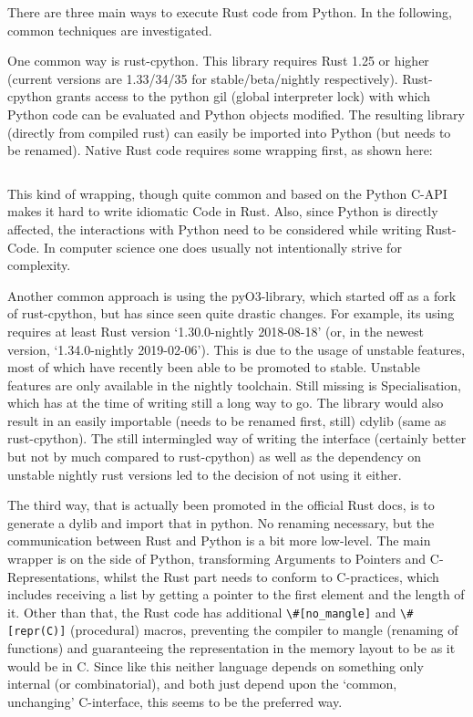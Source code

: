 There are three main ways to execute Rust code from Python. In the following,
common techniques are investigated.


One common way is rust-cpython. This library requires Rust 1.25 or higher
(current versions are 1.33/34/35 for stable/beta/nightly respectively).
Rust-cpython grants access to the python gil (global interpreter lock) with
which Python code can be evaluated and Python objects modified. The resulting
library (directly from compiled rust) can easily be imported into Python (but
needs to be renamed). Native Rust code requires some wrapping first, as shown
here:

\inputminted{Rust}{code_cpython.rs}

This kind of wrapping, though quite common and based on the Python C-API makes
it hard to write idiomatic Code in Rust. Also, since Python is directly
affected, the interactions with Python need to be considered while writing
Rust-Code. In computer science one does usually not intentionally strive for
complexity.

Another common approach is using the pyO3-library, which started off as a fork
of rust-cpython, but has since seen quite drastic changes. For example, its
using requires at least Rust version ‘1.30.0-nightly 2018-08-18’ (or, in the
newest version, ‘1.34.0-nightly 2019-02-06’). This is due to the usage of
unstable features, most of which have recently been able to be promoted to
stable. Unstable features are only available in the nightly toolchain.  Still
missing is Specialisation, which has at the time of writing still a long way to
go.  The library would also result in an easily importable (needs to be renamed
first, still) cdylib (same as rust-cpython). The still intermingled way of
writing the interface (certainly better but not by much compared to
rust-cpython) as well as the dependency on unstable nightly rust versions led
to the decision of not using it either.

The third way, that is actually been promoted in the official Rust docs, is to
generate a dylib and import that in python. No renaming necessary, but the
communication between Rust and Python is a bit more low-level. The main wrapper
is on the side of Python, transforming Arguments to Pointers and
C-Representations, whilst the Rust part needs to conform to C-practices, which
includes receiving a list by getting a pointer to the first element and the
length of it. Other than that, the Rust code has additional
\verb!\#[no_mangle]! and \verb!\#[repr(C)]!  (procedural) macros, preventing
the compiler to mangle (renaming of functions) and guaranteeing the
representation in the memory layout to be as it would be in C. Since like this
neither language depends on something only internal (or combinatorial), and
both just depend upon the ‘common, unchanging’ C-interface, this seems to be
the preferred way.

